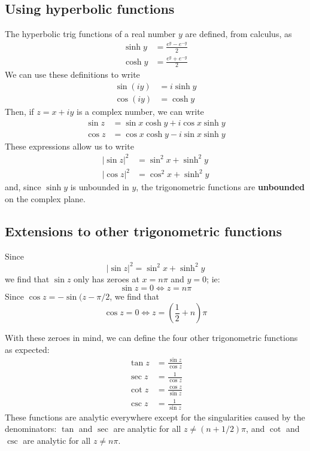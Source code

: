 \documentclass{article}
\renewcommand{\emph}{\textbf}
\begin{document}
\subsection{Using hyperbolic functions}
The hyperbolic trig functions of a real number $y$ are defined, from calculus, as
\begin{align*}
	\sinh y &= \frac{e^y - e^{-y}}{2} \\
	\cosh y &= \frac{e^y + e^{-y}}{2}
\end{align*}
We can use these definitions to write
\begin{align*}
	\sin(iy) &= i \sinh y \\
	\cos(iy) &=   \cosh y
\end{align*}
Then, if $z = x + iy$ is a complex number, we can write
\begin{align*}
	\sin z &= \sin x \cosh y + i \cos x \sinh y \\
	\cos z &= \cos x \cosh y - i \sin x \sinh y
\end{align*}
These expressions allow us to write
\begin{align*}
	|\sin z|^2 &= \sin^2 x + \sinh^2 y \\
	|\cos z|^2 &= \cos^2 x + \sinh^2 y
\end{align*}
and, since $\sinh y$ is unbounded in $y$, the trigonometric functions are \emph{unbounded} on the complex plane.

\subsection{Extensions to other trigonometric functions}
Since
\[
	|\sin z|^2 = \sin^2 x + \sinh^2 y
\]
we find that $\sin z$ only has zeroes at $x = n \pi$ and $y = 0$; ie:
\[
	\sin z = 0 \iff z = n\pi
\]
Since $\cos z = -\sin(z - \pi/2$, we find that 
\[
	\cos z = 0 \iff z = \left( \frac{1}{2} + n \right) \pi
\]

With these zeroes in mind, we can define the four other trigonometric functions as expected:
\begin{align*}
	\tan z &= \frac{\sin z}{\cos z} \\
	\sec z &= \frac{1}{\cos z} \\
	\cot z &= \frac{\cos z}{\sin z} \\
	\csc z &= \frac{1}{\sin z}
\end{align*}
These functions are analytic everywhere except for the singularities caused by the denominators: $\tan$ and $\sec$ are analytic for all $z \neq (n + 1/2)\pi$, and $\cot$ and $\csc$ are analytic for all $z \neq n\pi$. 
\end{document}
